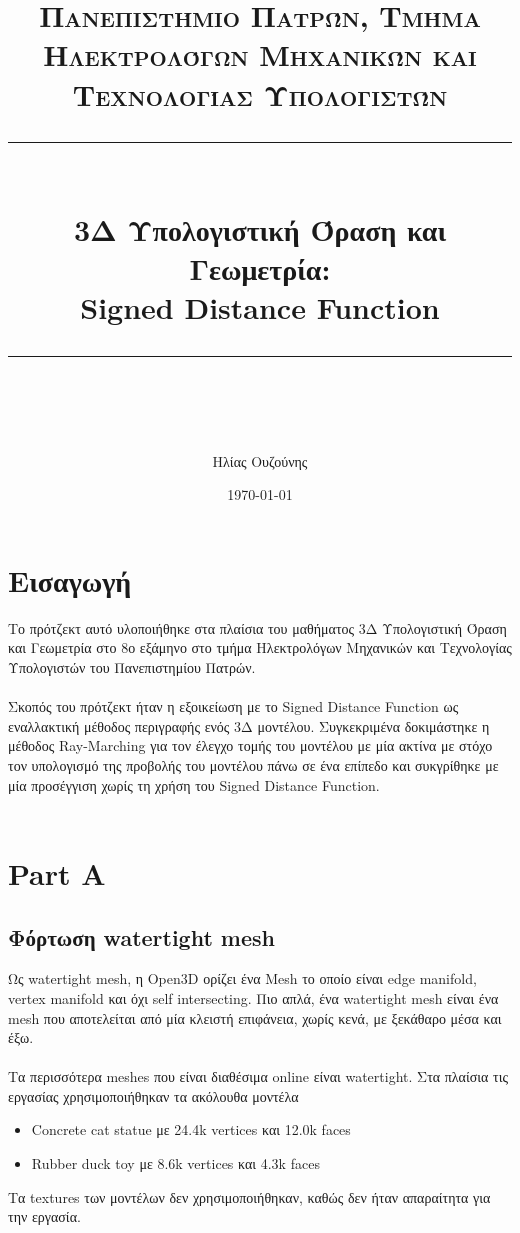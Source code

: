 \documentclass{report}
\title{	
	\normalfont\normalsize
	\textsc{Πανεπιστήμιο Πατρών, Τμήμα Ηλεκτρολόγων Μηχανικών και Τεχνολογίας Υπολογιστών}\\ %
	\vspace{25pt} %
	\rule{\linewidth}{0.5pt}\\ %
	\vspace{20pt} %
	{\huge 3Δ Υπολογιστική Όραση και Γεωμετρία: \\ Signed Distance Function}\\ %
	\vspace{12pt} %
	\rule{\linewidth}{2pt}\\ %
	\vspace{12pt} %
}
\author{\LARGE Ηλίας Ουζούνης \\ \en{up1083749}} %
\date{\normalsize\today} %
\begin{document}
\maketitle
\newpage

\sloppy
\tableofcontents
\newpage

\chapter{Εισαγωγή}
Το πρότζεκτ αυτό υλοποιήθηκε στα πλαίσια του μαθήματος 3Δ Υπολογιστική Όραση και Γεωμετρία στο 8ο εξάμηνο στο τμήμα Ηλεκτρολόγων
Μηχανικών και Τεχνολογίας Υπολογιστών του Πανεπιστημίου Πατρών.
\\\\
Σκοπός του πρότζεκτ ήταν η εξοικείωση με το Signed Distance Function ως εναλλακτική μέθοδος περιγραφής ενός 3Δ μοντέλου. 
Συγκεκριμένα δοκιμάστηκε η μέθοδος Ray-Marching για τον έλεγχο τομής του μοντέλου με μία ακτίνα με στόχο τον υπολογισμό
της προβολής του μοντέλου πάνω σε ένα επίπεδο και συκγρίθηκε με μία προσέγγιση χωρίς τη χρήση του Signed Distance Function.
\\\\

\chapter{Part A}
\section{Φόρτωση watertight mesh}

Ως watertight mesh, η Open3D ορίζει ένα Mesh το οποίο είναι edge manifold, vertex manifold και όχι self intersecting. Πιο απλά,
ένα watertight mesh είναι ένα mesh που αποτελείται από μία κλειστή επιφάνεια, χωρίς κενά, με ξεκάθαρο μέσα και έξω. 
\\\\
Τα περισσότερα meshes που είναι διαθέσιμα online είναι watertight. Στα πλαίσια τις εργασίας χρησιμοποιήθηκαν τα ακόλουθα μοντέλα
\begin{itemize}
    \item Concrete cat statue \cite{concrete-cat-statue} με 24.4k vertices και 12.0k faces
    \item Rubber duck toy \cite{rubber-duck-toy} με 8.6k vertices και 4.3k faces
\end{itemize}

Τα textures των μοντέλων δεν χρησιμοποιήθηκαν, καθώς δεν ήταν απαραίτητα για την εργασία.
\end{document}
